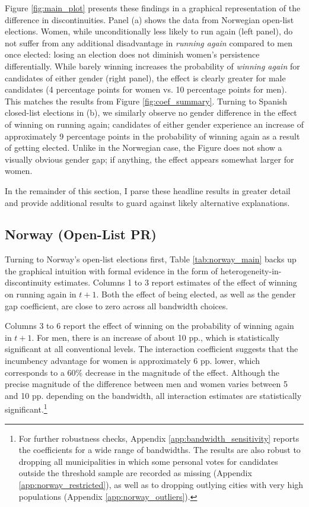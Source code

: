 \documentclass[12pt]{article}
\begin{document}
Figure \ref{fig:main_plot} presents these findings in a graphical representation of the difference in discontinuities. Panel (a) shows the data from Norwegian open-list elections. Women, while unconditionally less likely to run again (left panel), do not suffer from any additional disadvantage in \emph{running again} compared to men once elected:
losing an election does not diminish women's persistence differentially. While barely winning increases the probability of \emph{winning again} for candidates of either gender (right panel), the effect is clearly greater for male candidates (4 percentage points for women vs. 10 percentage points for men). This matches the results from Figure \ref{fig:coef_summary}. Turning to Spanish closed-list elections in (b), we similarly observe no gender difference in the effect of winning on running again; candidates of either gender experience an increase of approximately 9 percentage points in the probability of winning again as a result of getting elected. Unlike in the Norwegian case, the Figure does not show a visually obvious gender gap; if anything, the effect appears somewhat larger for women.

In the remainder of this section, I parse these headline results in greater detail and provide additional results to guard against likely alternative explanations.

\subsection{Norway (Open-List PR)}

Turning to Norway's open-list elections first, Table \ref{tab:norway_main} backs up the graphical intuition with formal evidence in the form of heterogeneity-in-discontinuity estimates. Columns 1 to 3 report estimates of the effect of winning on running again in $t + 1$. Both the effect of being elected, as well as the gender gap coefficient, are close to zero across all bandwidth choices.



Columns 3 to 6 report the effect of winning on the probability of winning again in $t + 1$. For men, there is an increase of about 10 pp., which is statistically significant at all conventional levels. The interaction coefficient suggests that the incumbency advantage for women is approximately 6 pp. lower, which corresponds to a 60\% decrease in the magnitude of the effect. Although the precise magnitude of the difference between men and women varies between 5 and 10 pp. depending on the bandwidth, all interaction estimates are statistically significant.\footnote{For further robustness checks, Appendix \ref{app:bandwidth_sensitivity} reports the coefficients for a wide range of bandwidths. The results are also robust to dropping all municipalities in which some personal votes for candidates outside the threshold sample are recorded as missing (Appendix \ref{app:norway_restricted}), as well as to dropping outlying cities with very high populations (Appendix \ref{app:norway_outliers}).}
\end{document}
